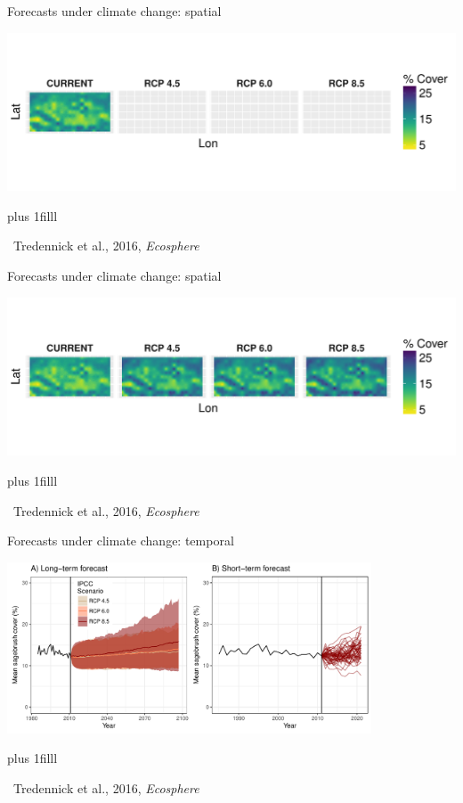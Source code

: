\documentclass[12pt, compress, aspectratio=1610]{beamer}
\newcommand{\btVFill}{\vskip0pt plus 1filll}
\newcommand{\credit}[1]{\btVFill\par\hfill \footnotesize ~#1}
\begin{document}
\begin{frame}{%
\protect\hypertarget{forecasts-under-climate-change-spatial}{%
Forecasts under climate change: spatial}}

\includegraphics[width=\textwidth]{./figures/clim_change_mean_spatial_empty.pdf}

\credit{Tredennick et al., 2016, \emph{Ecosphere}}

\end{frame}

\begin{frame}{%
\protect\hypertarget{forecasts-under-climate-change-spatial-1}{%
Forecasts under climate change: spatial}}

\includegraphics[width=\textwidth]{./figures/clim_change_mean_spatial.pdf}

\credit{Tredennick et al., 2016, \emph{Ecosphere}}

\end{frame}

\begin{frame}{%
\protect\hypertarget{forecasts-under-climate-change-temporal}{%
Forecasts under climate change: temporal}}

\centering

\includegraphics[height=2in]{./figures/temporal_forecasts_presentation.pdf}

\credit{Tredennick et al., 2016, \emph{Ecosphere}}

\end{frame}
\end{document}
